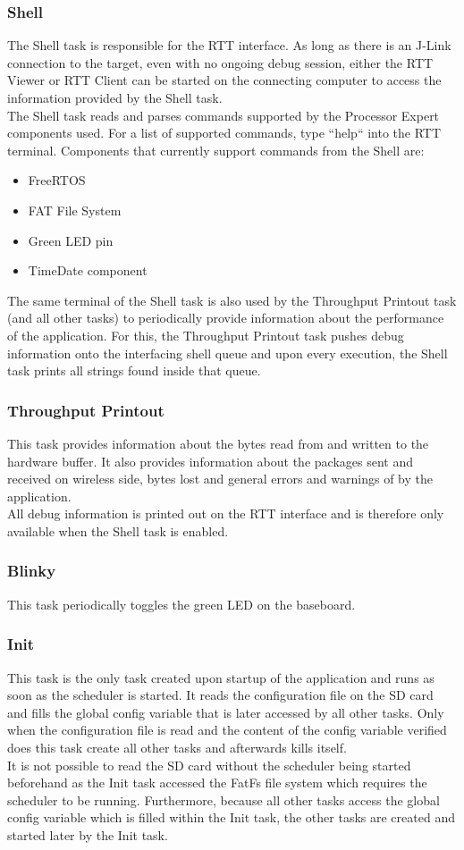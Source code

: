 \subsubsection{Shell}
The Shell task is responsible for the RTT interface. As long as there is an J-Link connection to the target, even with no ongoing debug session, either the RTT Viewer or RTT Client can be started on the connecting computer to access the information provided by the Shell task.\\
The Shell task reads and parses commands supported by the Processor Expert components used. For a list of supported commands, type ``help`` into the RTT terminal. Components that currently support commands from the Shell are:\begin{itemize}
    \item FreeRTOS
    \item FAT File System
    \item Green LED pin
    \item TimeDate component
\end{itemize}
The same terminal of the Shell task is also used by the Throughput Printout task (and all other tasks) to periodically provide information about the performance of the application. For this, the Throughput Printout task pushes debug information onto the interfacing shell queue and upon every execution, the Shell task prints all strings found inside that queue.
%
\subsubsection{Throughput Printout}
This task provides information about the bytes read from and written to the hardware buffer. It also provides information about the packages sent and received on wireless side, bytes lost and general errors and warnings of by the application.\\
All debug information is printed out on the RTT interface and is therefore only available when the Shell task is enabled.
%
\subsubsection{Blinky}
This task periodically toggles the green LED on the baseboard.
%
\subsubsection{Init} \label{subsec:txtInitTask}
This task is the only task created upon startup of the application and runs as soon as the scheduler is started. It reads the configuration file on the SD card and fills the global config variable that is later accessed by all other tasks. Only when the configuration file is read and the content of the config variable verified does this task create all other tasks and afterwards kills itself.\\
It is not possible to read the SD card without the scheduler being started beforehand as the Init task accessed the FatFs file system which requires the scheduler to be running. Furthermore, because all other tasks access the global config variable which is filled within the Init task, the other tasks are created and started later by the Init task.
%
